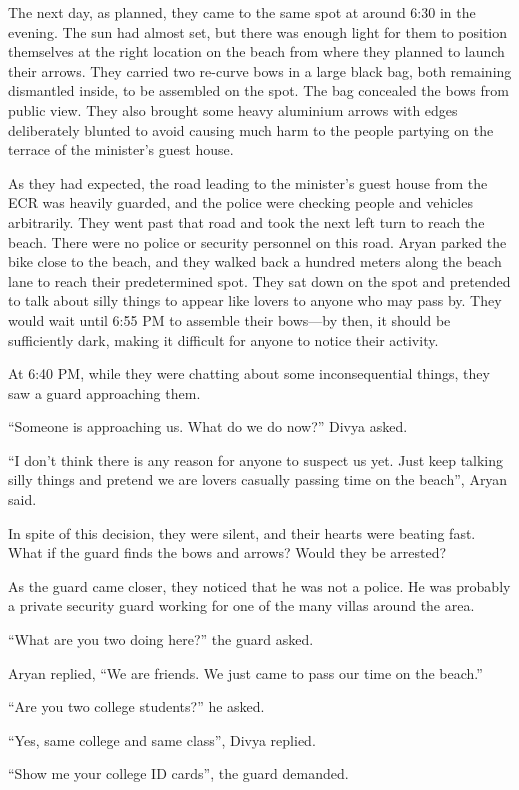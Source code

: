 The next day, as planned, they came to the same spot at around 6:30 in the evening.
The sun had almost set, but there was enough light for them to position
themselves at the right location on the beach from where they planned to launch
their arrows. They carried two re-curve bows in a large black bag, both remaining
dismantled inside, to be assembled on the spot. The bag concealed the bows
from public view. They also brought some heavy aluminium arrows with
edges deliberately blunted to avoid causing much harm to the people
partying on the terrace of the minister's guest house.

As they had expected, the road leading to the minister's guest house from the
ECR was heavily guarded, and the police were checking people and vehicles
arbitrarily. They went past that road and took the next left turn to reach the
beach. There were no police or security personnel on this road. Aryan parked the bike close
to the beach, and they walked back a hundred meters along the beach lane to reach
their predetermined spot. They sat down on the spot and pretended to talk about
silly things to appear like lovers to anyone who may pass by. They would
wait until 6:55 PM to assemble their bows—by then, it should be
sufficiently dark, making it difficult for anyone to notice their activity.

At 6:40 PM, while they were chatting about some inconsequential things, they saw
a guard approaching them.

“Someone is approaching us. What do we do now?” Divya asked.

“I don't think there is any reason for anyone to suspect us yet. Just keep
talking silly things and pretend we are lovers casually passing time on
the beach”, Aryan said.

In spite of this decision, they were silent, and their hearts were beating fast.
What if the guard finds the bows and arrows? Would they be arrested?

As the guard came closer, they noticed that he was not a police. He was probably
a private security guard working for one of the many villas around the area.

“What are you two doing here?” the guard asked.

Aryan replied, “We are friends. We just came to pass our time on the beach.”

“Are you two college students?” he asked.

“Yes, same college and same class”, Divya replied.

“Show me your college ID cards”, the guard demanded.

